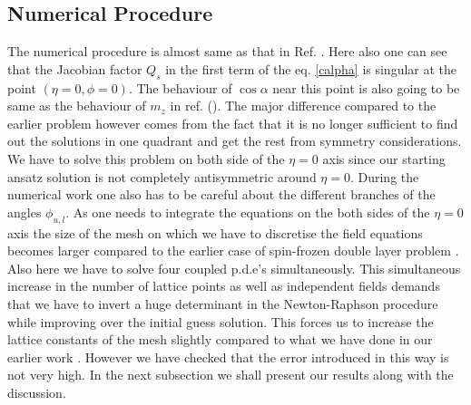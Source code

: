 \subsection{Numerical Procedure}
The numerical procedure is almost same as that in  Ref. \cite{Ghosh2}.
Here also one can see that the Jacobian factor $Q_{s}$ in the 
first term of the eq. \ref{calpha}  
 is singular at the point 
$(\eta=0,\phi=0)$. The behaviour of $\cos \alpha$ near this
point is also going to be 
same as the  behaviour of $m_z$ in ref. (\cite{Ghosh2}).
 The major difference compared to the earlier problem however 
comes from the fact that it is no longer  
sufficient to find out the solutions in one quadrant and  
get the rest from symmetry considerations. 
We have to solve this problem 
on both side of the $\eta = 0$ axis since our starting ansatz solution
is not completely antisymmetric
around $\eta = 0$.
During the numerical work one also has to be careful about 
the different branches of the angles $\phi_{u,l}$. As one needs to
 integrate the
equations on the both sides of the $\eta = 0$ axis the size of the mesh
on which we have to discretise the field equations becomes larger compared
to the earlier case of spin-frozen double layer problem \cite{Ghosh2}.
Also here we have to solve four coupled p.d.e's simultaneously. 
 This simultaneous increase in the number of lattice points
as well as independent fields  demands that we have to invert a 
huge determinant in the Newton-Raphson procedure \cite{numer}
while improving over the initial guess solution. This forces us
to increase the lattice constants of the mesh slightly compared to 
what we have done in our earlier work \cite{Ghosh2}. 
However we have checked that the error
introduced in this way is not very high. In the next 
subsection we shall present
our results along with the discussion.

